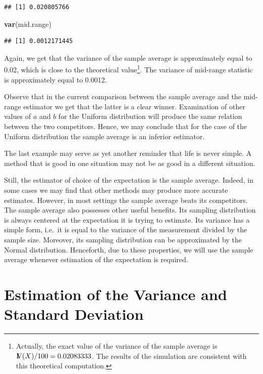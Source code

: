 \documentclass[]{krantz}
\makeatletter
\newenvironment{Shaded}{\begin{snugshade}}{\end{snugshade}}
\newcommand{\KeywordTok}[1]{\textcolor[rgb]{0.13,0.29,0.53}{\textbf{#1}}}
\newcommand{\NormalTok}[1]{#1}
\newcommand{\Var}{{\rm I\kern-.3em V}}
\newenvironment{kframe}{%
\medskip{}
\setlength{\fboxsep}{.8em}
 \def\at@end@of@kframe{}%
 \ifinner\ifhmode%
  \def\at@end@of@kframe{\end{minipage}}%
  \begin{minipage}{\columnwidth}%
 \fi\fi%
 \def\FrameCommand##1{\hskip\@totalleftmargin \hskip-\fboxsep
 \colorbox{shadecolor}{##1}\hskip-\fboxsep
     \hskip-\linewidth \hskip-\@totalleftmargin \hskip\columnwidth}%
 \MakeFramed {\advance\hsize-\width
   \@totalleftmargin\z@ \linewidth\hsize
   \@setminipage}}%
 {\par\unskip\endMakeFramed%
 \at@end@of@kframe}
\renewenvironment{Shaded}{\begin{kframe}}{\end{kframe}}
\theoremstyle{definition}
\theoremstyle{definition}
\theoremstyle{definition}
\theoremstyle{remark}
\makeatother
\begin{document}
\begin{verbatim}
## [1] 0.020805766
\end{verbatim}

\begin{Shaded}
\begin{Highlighting}[]
\KeywordTok{var}\NormalTok{(mid.range)}
\end{Highlighting}
\end{Shaded}

\begin{verbatim}
## [1] 0.0012171445
\end{verbatim}

Again, we get that the variance of the sample average is approximately
equal to 0.02, which is close to the theoretical value\footnote{Actually, the exact value of the variance of the sample average is
  \(\Var(X)/100 = 0.02083333\). The results of the simulation are
  consistent with this theoretical computation.}. The variance
of mid-range statistic is approximately equal to 0.0012.

Observe that in the current comparison between the sample average and
the mid-range estimator we get that the latter is a clear winner.
Examination of other values of \(a\) and \(b\) for the Uniform distribution
will produce the same relation between the two competitors. Hence, we
may conclude that for the case of the Uniform distribution the sample
average is an inferior estimator.

The last example may serve as yet another reminder that life is never
simple. A method that is good in one situation may not be as good in a
different situation.

Still, the estimator of choice of the expectation is the sample average.
Indeed, in some cases we may find that other methods may produce more
accurate estimates. However, in most settings the sample average beats
its competitors. The sample average also possesses other useful
benefits. Its sampling distribution is always centered at the
expectation it is trying to estimate. Its variance has a simple form,
i.e.~it is equal to the variance of the measurement divided by the
sample size. Moreover, its sampling distribution can be approximated by
the Normal distribution. Henceforth, due to these properties, we will
use the sample average whenever estimation of the expectation is
required.

\hypertarget{estimation-of-the-variance-and-standard-deviation}{%
\section{Estimation of the Variance and Standard Deviation}\label{estimation-of-the-variance-and-standard-deviation}}
\end{document}
